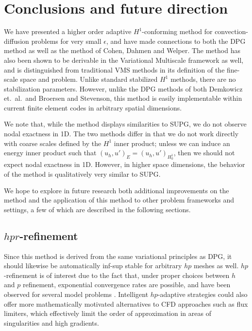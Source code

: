 \documentclass[final,leqno]{siamltex}
\newcommand{\LRp}[1]{\left( #1 \right)}
\begin{document}

\section{Conclusions and future direction}

We have presented a higher order adaptive $H^1$-conforming method for convection-diffusion problems for very small $\epsilon$, and have made connections to both the DPG method as well as the method of Cohen, Dahmen and Welper.  The method has also been shown to be derivable in the Variational Multiscale framework as well, and is distinguished from traditional VMS methods in its definition of the fine-scale space and problem.  Unlike standard stabilized $H^1$ methods, there are no stabilization parameters.  However, unlike the DPG methods of both Demkowicz et.\ al.\ and Broersen and Stevenson, this method is easily implementable within current finite element codes in arbitrary spatial dimensions.

We note that, while the method displays similarities to SUPG, we do not observe nodal exactness in 1D.  The two methods differ in that we do not work directly with coarse scales defined by the $H^1$ inner product; unless we can induce an energy inner product such that $\LRp{u_h,u'}_E = \LRp{u_h,u'}_{H^1_0}$, then we should not expect nodal exactness in 1D.  However, in higher space dimensions, the behavior of the method is qualitatively very similar to SUPG.  

We hope to explore in future research both additional improvements on the method and the application of this method to other problem frameworks and settings, a few of which are described in the following sections.  

\subsection{$hpr$-refinement}

Since this method is derived from the same variational principles as DPG, it should likewise be automatically inf-sup stable for arbitrary $hp$ meshes as well.  $hp$-refinement is of interest due to the fact that, under proper choices between $h$ and $p$ refinement, exponential convergence rates are possible, and have been observed for several model problems \cite{demkowicz2006computing}.  Intelligent $hp$-adaptive strategies could also offer more mathematically motivated alternatives to CFD approaches such as flux limiters, which effectively limit the order of approximation in areas of singularities and high gradients.  
\end{document}
